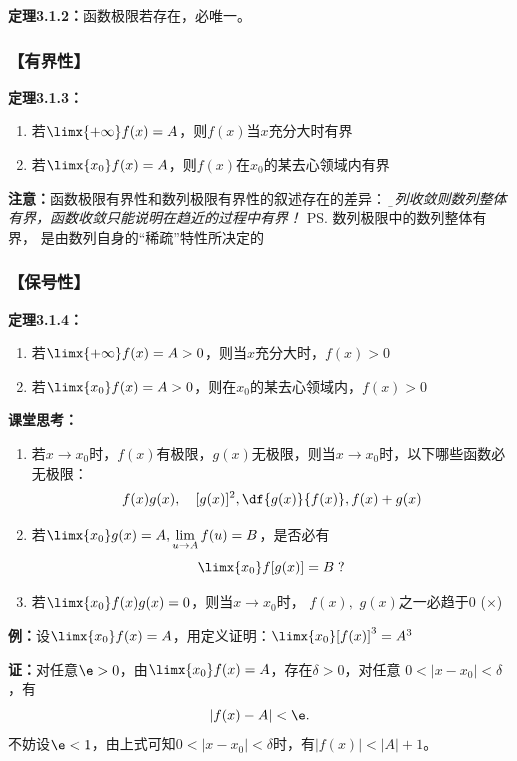 {\bf 定理3.1.2：}函数极限若存在，必唯一。

\subsubsection{【有界性】}

{\bf 定理3.1.3：}
\begin{enumerate}[(1)]
  \setlength{\itemindent}{1cm}
  \item 若$\limx{+\infty}f(x)=A$，则$f(x)$当$x$充分大时有界
  \item 若$\limx{x_0}f(x)=A$，则$f(x)$在$x_0$的某去心领域内有界
\end{enumerate}

{\bf 注意：}函数极限有界性和数列极限有界性的叙述存在的差异：
{\it\b 数列收敛则数列整体有界，函数收敛只能说明在趋近的过程中有界！}
\ps{数列极限中的数列整体有界，
是由数列自身的“稀疏”特性所决定的}

\subsubsection{【保号性】}

{\bf 定理3.1.4：}
\begin{enumerate}[(1)]
  \setlength{\itemindent}{1cm}
  \item 若$\limx{+\infty}f(x)=A>0$，则当$x$充分大时，$f(x)>0$
  \item 若$\limx{x_0}f(x)=A>0$，则在$x_0$的某去心领域内，$f(x)>0$
\end{enumerate}

{\bf 课堂思考：}
\begin{enumerate}[(1)]
  \setlength{\itemindent}{1cm}
  \item 若$x\to x_0$时，$f(x)$有极限，$g(x)$无极限，则当$x\to x_0$时，以下哪些函数必无极限：
  $$f(x)g(x),\quad [g(x)]^2,\df{g(x)}{f(x)}, f(x)+g(x)$$ 
  \item 若$\limx{x_0}g(x)=A,\lim\limits_{u\to A}f(u)=B$，是否必有
  $$\limx{x_0}f[g(x)]=B\;?$$
  \item 若$\limx{x_0}f(x)g(x)=0$，则当$x\to
  x_0$时， $f(x),$ $g(x)$之一必趋于$0$ ({$\times$})
\end{enumerate}

{\bf 例：}设$\limx{x_0}f(x)=A$，用定义证明：$\limx{x_0}[f(x)]^3=A^3$

{\bf 证：}对任意$\e>0$，由$\limx{x_0}f(x)=A$，存在$\delta>0$，对任意
$0<|x-x_0|<\delta$，有
$$|f(x)-A|<\e.$$
不妨设$\e<1$，由上式可知$0<|x-x_0|<\delta$时，有$|f(x)|<|A|+1$。

